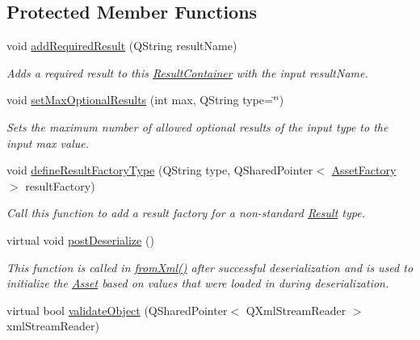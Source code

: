 \subsection*{Protected Member Functions}
\begin{DoxyCompactItemize}
\item 
void \hyperlink{class_picto_1_1_result_container_ab7a332b07952bad7173ecf04f4c656bc}{add\-Required\-Result} (Q\-String result\-Name)
\begin{DoxyCompactList}\small\item\em Adds a required result to this \hyperlink{class_picto_1_1_result_container}{Result\-Container} with the input result\-Name. \end{DoxyCompactList}\item 
void \hyperlink{class_picto_1_1_result_container_a127ff113eda9671d7b7d18a0336302e9}{set\-Max\-Optional\-Results} (int max, Q\-String type=\char`\"{}\char`\"{})
\begin{DoxyCompactList}\small\item\em Sets the maximum number of allowed optional results of the input type to the input max value. \end{DoxyCompactList}\item 
void \hyperlink{class_picto_1_1_result_container_a88c10f5402ea12abbab92e51af6f1f47}{define\-Result\-Factory\-Type} (Q\-String type, Q\-Shared\-Pointer$<$ \hyperlink{class_picto_1_1_asset_factory}{Asset\-Factory} $>$ result\-Factory)
\begin{DoxyCompactList}\small\item\em Call this function to add a result factory for a non-\/standard \hyperlink{class_picto_1_1_result}{Result} type. \end{DoxyCompactList}\item 
virtual void \hyperlink{class_picto_1_1_result_container_ad0e8001bc4f03291cfd65c0c903c88f3}{post\-Deserialize} ()
\begin{DoxyCompactList}\small\item\em This function is called in \hyperlink{class_picto_1_1_asset_a8bed4da09ecb1c07ce0dab313a9aba67}{from\-Xml()} after successful deserialization and is used to initialize the \hyperlink{class_picto_1_1_asset}{Asset} based on values that were loaded in during deserialization. \end{DoxyCompactList}\item 
\hypertarget{class_picto_1_1_result_container_a9c2987bcce16718221d1902c9f781532}{virtual bool \hyperlink{class_picto_1_1_result_container_a9c2987bcce16718221d1902c9f781532}{validate\-Object} (Q\-Shared\-Pointer$<$ Q\-Xml\-Stream\-Reader $>$ xml\-Stream\-Reader)}\label{class_picto_1_1_result_container_a9c2987bcce16718221d1902c9f781532}


\end{DoxyCompactItemize}
